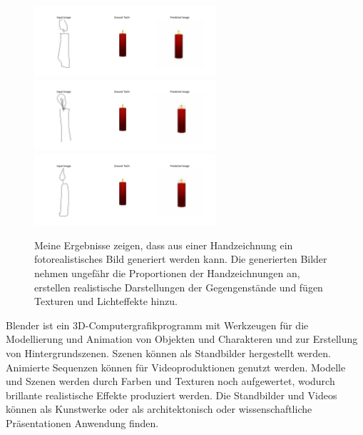 \begin{figure}[h]
	\includegraphics[width=0.6\textwidth]{bilder/candle1small.png}
	\includegraphics[width=0.6\textwidth]{bilder/candle2small.png}
	\includegraphics[width=0.6\textwidth]{bilder/candle3small.png}
	\caption[Eigene Beispiele]{Meine Ergebnisse zeigen, dass aus einer Handzeichnung ein fotorealistisches Bild generiert werden kann. Die generierten Bilder nehmen ungefähr die Proportionen der Handzeichnungen an, erstellen realistische Darstellungen der Gegengenstände und fügen Texturen und Lichteffekte hinzu.}
	\label{fig:myexamples}
\end{figure}

Blender ist ein 3D-Computergrafikprogramm mit Werkzeugen für die Modellierung und Animation von Objekten und Charakteren und zur Erstellung von Hintergrundszenen. Szenen können als Standbilder hergestellt werden. Animierte Sequenzen können für Videoproduktionen genutzt werden. Modelle und Szenen werden durch Farben und Texturen noch aufgewertet, wodurch brillante realistische Effekte produziert werden. Die Standbilder und Videos können als Kunstwerke oder als architektonisch oder wissenschaftliche Präsentationen Anwendung finden. \cite{blain2020blender}
